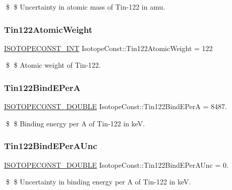 \$ \$ Uncertainty in atomic mass of Tin-\/122 in amu. \mbox{\label{group___isotope_const-_tin-_sn122_ga2683f2ee772de38bcb408c0a14703465}} 
\subsubsection{\texorpdfstring{Tin122\+Atomic\+Weight}{Tin122AtomicWeight}}
{\footnotesize\ttfamily \mbox{\hyperlink{group___isotope_const-_macros_ga5f18360b3e99483a35c32d789e62621c}{I\+S\+O\+T\+O\+P\+E\+C\+O\+N\+S\+T\+\_\+\+I\+NT}} Isotope\+Const\+::\+Tin122\+Atomic\+Weight = 122}

\$ \$ Atomic weight of Tin-\/122. \mbox{\label{group___isotope_const-_tin-_sn122_ga149905eba2d7441faebabdab2bda523c}} 
\subsubsection{\texorpdfstring{Tin122\+Bind\+E\+PerA}{Tin122BindEPerA}}
{\footnotesize\ttfamily \mbox{\hyperlink{group___isotope_const-_macros_ga8f45a7272ce02c0b4c65c44636ed719a}{I\+S\+O\+T\+O\+P\+E\+C\+O\+N\+S\+T\+\_\+\+D\+O\+U\+B\+LE}} Isotope\+Const\+::\+Tin122\+Bind\+E\+PerA = 8487.}

\$ \$ Binding energy per A of Tin-\/122 in keV. \mbox{\label{group___isotope_const-_tin-_sn122_ga4decaf5c2b18d58e71c27935df229fbb}} 
\subsubsection{\texorpdfstring{Tin122\+Bind\+E\+Per\+A\+Unc}{Tin122BindEPerAUnc}}
{\footnotesize\ttfamily \mbox{\hyperlink{group___isotope_const-_macros_ga8f45a7272ce02c0b4c65c44636ed719a}{I\+S\+O\+T\+O\+P\+E\+C\+O\+N\+S\+T\+\_\+\+D\+O\+U\+B\+LE}} Isotope\+Const\+::\+Tin122\+Bind\+E\+Per\+A\+Unc = 0.}

\$ \$ Uncertainty in binding energy per A of Tin-\/122 in keV. \mbox{\label{group___isotope_const-_tin-_sn122_gaca3502328896553cdb59eba7357dd695}} 
